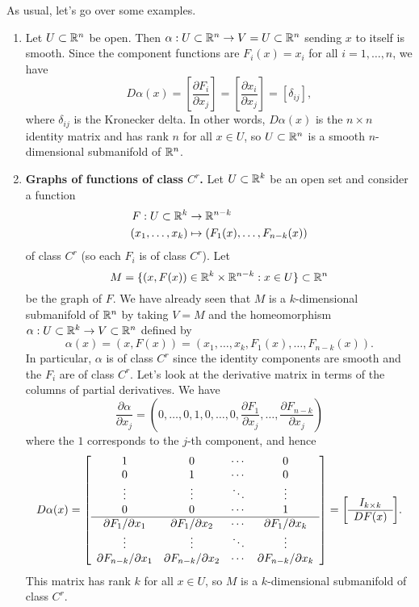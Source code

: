 As usual, let's go over some examples. 
\begin{enumerate}[(1)]
    \item Let $U \subset \mathbb{R}^n$ be open. Then $\alpha : U \subset \mathbb{R}^n \to 
    V = U \subset \mathbb{R}^n$ sending $x$ to itself is smooth. Since the 
    component functions are $F_i(x) = x_i$ for all $i = 1, \dots, n$, we have 
    \[ D\alpha(x) = \left[ \frac{\partial F_i}{\partial x_j} \right] 
    = \left[ \frac{\partial x_i}{\partial x_j} \right] = [\delta_{ij}], \] 
    where $\delta_{ij}$ is the Kronecker delta. In other words, $D\alpha(x)$ 
    is the $n \times n$ identity matrix and has rank $n$ for all $x \in U$, 
    so $U \subset \mathbb{R}^n$ is a smooth $n$-dimensional submanifold of $\mathbb{R}^n$. 

    \item {\bf Graphs of functions of class $C^r$.} Let $U \subset \mathbb{R}^k$ 
    be an open set and consider a function 
    \begin{align*}
        F : U \subset \mathbb{R}^k &\to \mathbb{R}^{n-k} \\ 
        (x_1, \dots, x_k) &\mapsto (F_1(x), \dots, F_{n-k}(x)) 
    \end{align*} 
    of class $C^r$ (so each $F_i$ is of class $C^r$). Let 
    \[ M = \{(x, F(x)) \in \mathbb{R}^k \times \mathbb{R}^{n-k} : x \in U\} \subset \mathbb{R}^n \] 
    be the graph of $F$. We have already seen that $M$ is a $k$-dimensional 
    submanifold of $\mathbb{R}^n$ by taking $V = M$ and the homeomorphism 
    $\alpha : U \subset \mathbb{R}^k \to V \subset \mathbb{R}^n$ defined by 
    \[ \alpha(x) = (x, F(x)) = (x_1, \dots, x_k, F_1(x), \dots, F_{n-k}(x)). \]
    In particular, $\alpha$ is of class $C^r$ since the identity components 
    are smooth and the $F_i$ are of class $C^r$. Let's look at the 
    derivative matrix in terms of the columns of partial derivatives. We have 
    \[ \frac{\partial\alpha}{\partial x_j} = 
    \left( 0, \dots, 0, 1, 0, \dots, 0, \frac{\partial F_1}{\partial x_j}, 
    \dots, \frac{\partial F_{n-k}}{\partial x_j} \right) \] 
    where the $1$ corresponds to the $j$-th component, and hence 
    \[ D\alpha(x) = \mleft[ \begin{array}{cccc}
        1 & 0 & \cdots & 0 \\ 
        0 & 1 & \cdots & 0 \\ 
        \vdots & \vdots & \ddots & \vdots \\ 
        0 & 0 & \cdots & 1 \\ \hline 
        \partial F_1/\partial x_1 & \partial F_1/\partial x_2 & \cdots & \partial F_1/\partial x_k \\ 
        \vdots & \vdots & \ddots & \vdots \\ 
        \partial F_{n-k}/\partial x_1 & \partial F_{n-k}/\partial x_2 & \cdots & \partial F_{n-k}/\partial x_k \\
    \end{array} \mright] = \mleft[ \begin{array}{c} I_{k\times k} \\\hline DF(x) \end{array} \mright]. \]
    This matrix has rank $k$ for all $x \in U$, so $M$ is a $k$-dimensional 
    submanifold of class $C^r$. 


\end{enumerate}
